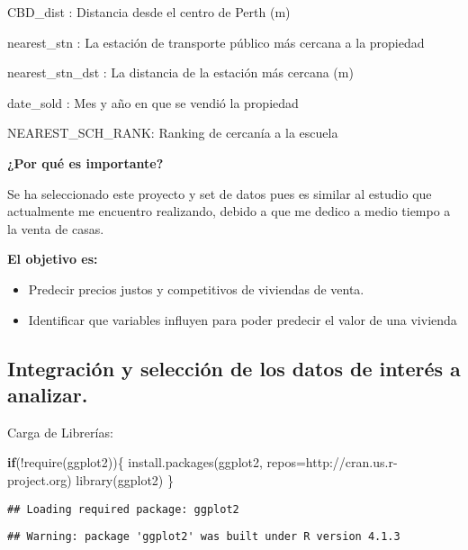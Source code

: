 \documentclass[
]{article}
\newenvironment{Shaded}{\begin{snugshade}}{\end{snugshade}}
\newcommand{\AttributeTok}[1]{\textcolor[rgb]{0.77,0.63,0.00}{#1}}
\newcommand{\ControlFlowTok}[1]{\textcolor[rgb]{0.13,0.29,0.53}{\textbf{#1}}}
\newcommand{\FunctionTok}[1]{\textcolor[rgb]{0.00,0.00,0.00}{#1}}
\newcommand{\NormalTok}[1]{#1}
\newcommand{\SpecialCharTok}[1]{\textcolor[rgb]{0.00,0.00,0.00}{#1}}
\newcommand{\StringTok}[1]{\textcolor[rgb]{0.31,0.60,0.02}{#1}}
\begin{document}
CBD\_dist : Distancia desde el centro de Perth (m)

nearest\_stn : La estación de transporte público más cercana a la
propiedad

nearest\_stn\_dst : La distancia de la estación más cercana (m)

date\_sold : Mes y año en que se vendió la propiedad

NEAREST\_SCH\_RANK: Ranking de cercanía a la escuela

\textbf{¿Por qué es importante?}

Se ha seleccionado este proyecto y set de datos pues es similar al
estudio que actualmente me encuentro realizando, debido a que me dedico
a medio tiempo a la venta de casas.

\textbf{El objetivo es:}

\begin{itemize}
\item
  Predecir precios justos y competitivos de viviendas de venta.
\item
  Identificar que variables influyen para poder predecir el valor de una
  vivienda
\end{itemize}

\hypertarget{integraciuxf3n-y-selecciuxf3n-de-los-datos-de-interuxe9s-a-analizar.}{%
\subsection{Integración y selección de los datos de interés a
analizar.}\label{integraciuxf3n-y-selecciuxf3n-de-los-datos-de-interuxe9s-a-analizar.}}

Carga de Librerías:

\begin{Shaded}
\begin{Highlighting}[]
\ControlFlowTok{if}\NormalTok{(}\SpecialCharTok{!}\FunctionTok{require}\NormalTok{(ggplot2))\{}
    \FunctionTok{install.packages}\NormalTok{(}\StringTok{\textquotesingle{}ggplot2\textquotesingle{}}\NormalTok{, }\AttributeTok{repos=}\StringTok{\textquotesingle{}http://cran.us.r{-}project.org\textquotesingle{}}\NormalTok{)}
    \FunctionTok{library}\NormalTok{(ggplot2)}
\NormalTok{\}}
\end{Highlighting}
\end{Shaded}

\begin{verbatim}
## Loading required package: ggplot2
\end{verbatim}

\begin{verbatim}
## Warning: package 'ggplot2' was built under R version 4.1.3
\end{verbatim}
\end{document}

